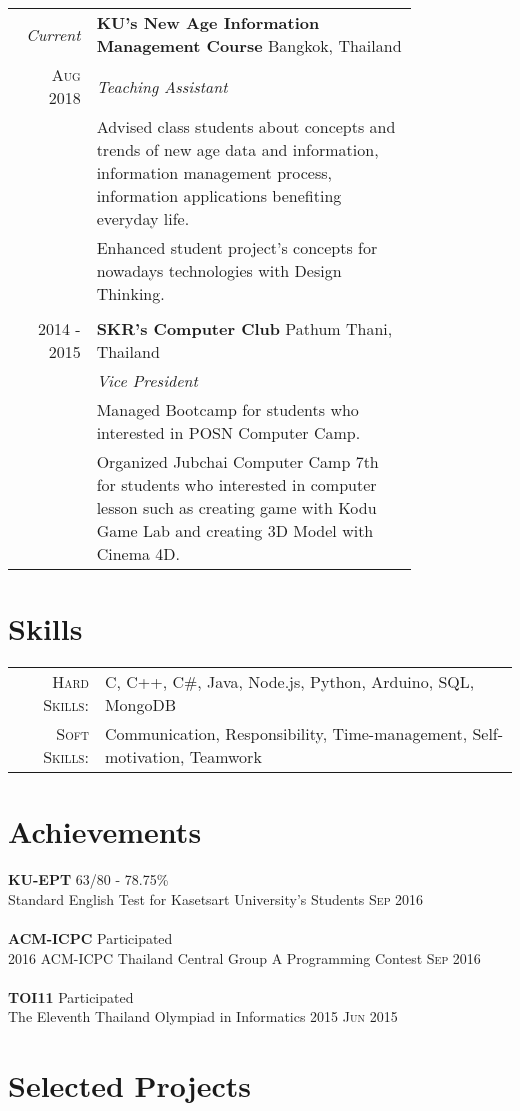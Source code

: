 \documentclass[a4paper]{article}
\newcommand{\tb}{\quad \textbullet \quad}
\begin{document}
\begin{tabular}{r|p{0.8\linewidth}}
	\textit{Current} & \textbf{KU's New Age Information Management Course} \hfill Bangkok, Thailand \\
 	\textsc{Aug 2018} & \textit{Teaching Assistant} \\ &
 	\tb Advised class students about concepts and trends of new age data and information, information management process, information applications benefiting everyday life. \\ &
 	\tb Enhanced student project's concepts for nowadays technologies with Design Thinking. \\
 	\multicolumn{2}{c}{} \\
 	\textsc{2014 - 2015} & \textbf{SKR's Computer Club} \hfill Pathum Thani, Thailand \\ & 
 	\textit{Vice President} \\ &
 	\tb Managed Bootcamp for students who interested in POSN Computer Camp. \\ &
 	\tb Organized Jubchai Computer Camp 7th for students who interested in computer lesson such as creating game with Kodu Game Lab and creating 3D Model with Cinema 4D. \\   
\end{tabular}

\section{Skills}

\begin{tabular}{rl}
	\textsc{Hard Skills:} & C, C++, C\#, Java, Node.js, Python, Arduino, SQL, MongoDB \\
	\textsc{Soft Skills:} & Communication, Responsibility, Time-management, Self-motivation, Teamwork \\
\end{tabular}

\section{Achievements}

\textbf{KU-EPT} \hfill 63/80 - 78.75\% \\
Standard English Test for Kasetsart University's Students \hfill \textsc{Sep 2016} \\
 \\
\textbf{ACM-ICPC} \hfill Participated \\
2016 ACM-ICPC Thailand Central Group A Programming Contest \hfill \textsc{Sep 2016} \\ 
 \\
\textbf{TOI11} \hfill Participated \\
The Eleventh Thailand Olympiad in Informatics 2015 \hfill \textsc{Jun 2015} \\

\section{Selected Projects}
\end{document}
